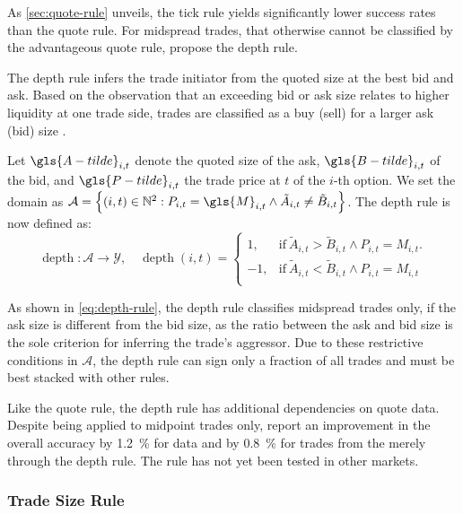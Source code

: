 As \cref{sec:quote-rule} unveils, the tick rule yields significantly lower success rates than the quote rule. For midspread trades, that otherwise cannot be classified by the advantageous quote rule, \textcite[][14]{grauerOptionTradeClassification2022} propose the depth rule.

The depth rule infers the trade initiator from the quoted size at the best bid and ask. Based on the observation that an exceeding bid or ask size relates to higher liquidity at one trade side, trades are classified as a buy (sell) for a larger ask (bid) size \autocite[][14]{grauerOptionTradeClassification2022}.

Let $\gls{A-tilde}_{i,t}$ denote the quoted size of the ask, $\gls{B-tilde}_{i,t}$ of the bid, and $\gls{P-tilde}_{i,t}$ the trade price at $t$ of the $i$-th option. We set the domain as $\mathcal{A} = \left\{(i, t) \in \mathbb{N}^2: P_{i,t} = \gls{M}_{i,t} \land \tilde{A}_{i,t} \neq \tilde{B}_{i,t} \right\}$. The depth rule is now defined as:
\begin{equation}
    \operatorname{depth} \colon \mathcal{A} \to \mathcal{Y},\quad
    \operatorname{depth}(i, t)=
    \begin{cases}
        1,  & \text{if}\ \tilde{A}_{i,t} > \tilde{B}_{i,t} \land P_{i, t} = M_{i, t}. \\
        -1, & \text{if}\ \tilde{A}_{i,t} < \tilde{B}_{i,t} \land P_{i, t} = M_{i, t}  \\
    \end{cases}
    \label{eq:depth-rule}
\end{equation}

As shown in \cref{eq:depth-rule}, the depth rule classifies midspread trades only, if the ask size is different from the bid size, as the ratio between the ask and bid size is the sole criterion for inferring the trade's aggressor. Due to these restrictive conditions in $\mathcal{A}$, the depth rule can sign only a fraction of all trades and must be best stacked with other rules.

Like the quote rule, the depth rule has additional dependencies on quote data. Despite being applied to midpoint trades only, \textcite[][4]{grauerOptionTradeClassification2022} report an improvement in the overall accuracy by \SI{1.2}{\percent} for  data and by \SI{0.8}{\percent} for trades from the  merely through the depth rule. The rule has not yet been tested in other markets.

\subsubsection{Trade Size Rule}\label{sec:trade-size-rule}

